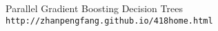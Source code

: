 \documentclass[a4paper,11pt]{book}
\begin{document}
\begin{thebibliography}{1}
Parallel Gradient Boosting Decision Trees
\\\texttt{http://zhanpengfang.github.io/418home.html}


\end{thebibliography}



%
%
%

%
%
%
\chapter*{}
\thispagestyle{empty}
\end{document}
